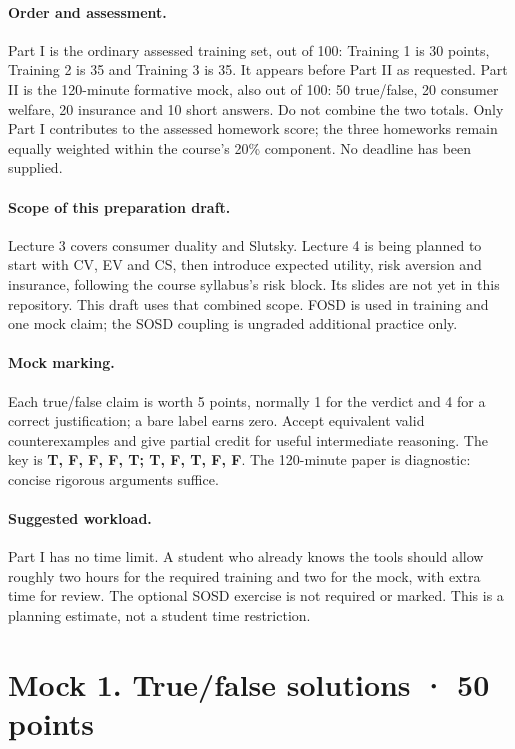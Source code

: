 \documentclass[11pt,a4paper]{article}
\begin{document}
\paragraph{Order and assessment.} Part I is the ordinary assessed training
set, out of 100: Training 1 is 30 points, Training 2 is 35 and Training 3 is 35.
It appears before Part II as requested. Part II is the 120-minute formative
mock, also out of 100: 50 true/false, 20 consumer welfare, 20 insurance and
10 short answers. Do not combine the two totals. Only Part I contributes to
the assessed homework score; the three homeworks remain equally weighted
within the course's 20\% component. No deadline has been supplied.

\paragraph{Scope of this preparation draft.} Lecture 3 covers consumer
duality and Slutsky. Lecture 4 is being planned to start with CV, EV and CS,
then introduce expected utility, risk aversion and insurance, following the
course syllabus's risk block. Its slides are not yet in this repository.
This draft uses that combined scope. FOSD is used in training and one mock
claim; the SOSD coupling is ungraded additional practice only.

\paragraph{Mock marking.} Each true/false claim is worth 5 points, normally
1 for the verdict and 4 for a correct justification; a bare label earns zero.
Accept equivalent valid counterexamples and give partial credit for useful
intermediate reasoning. The key is \textbf{T, F, F, F, T; T, F, T, F, F}.
The 120-minute paper is diagnostic: concise rigorous arguments suffice.

\paragraph{Suggested workload.} Part I has no time limit. A student who
already knows the tools should allow roughly two hours for the required
training and two for the mock, with extra time for review. The optional SOSD
exercise is not required or marked. This is a planning estimate, not a student
time restriction.

\clearpage
\clearpage
\clearpage\section*{Mock 1. True/false solutions · 50 points}

\clearpage
\clearpage
\clearpage
\end{document}
